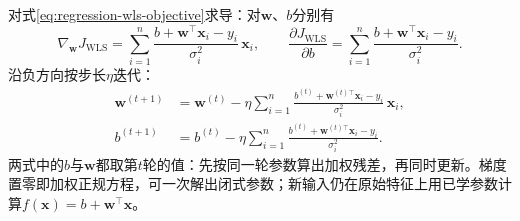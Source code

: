 对式\eqref{eq:regression-wls-objective}求导：对$\bm{w}$、$b$分别有
\[
  \nabla_{\bm w}J_{\mathrm{WLS}}
  =\sum_{i=1}^{n}\frac{b+\bm{w}^{\top}\bm{x}_i-y_i}{\sigma_i^2}\,\bm{x}_i,
  \qquad
  \frac{\partial J_{\mathrm{WLS}}}{\partial b}
  =\sum_{i=1}^{n}\frac{b+\bm{w}^{\top}\bm{x}_i-y_i}{\sigma_i^2}.
\]
沿负方向按步长$\eta$迭代：
\begin{align}
  \bm{w}^{(t+1)}
  &=\bm{w}^{(t)}-\eta\sum_{i=1}^{n}\frac{b^{(t)}+\bm{w}^{(t)\top}\bm{x}_i-y_i}{\sigma_i^2}\,\bm{x}_i,\\
  b^{(t+1)}
  &=b^{(t)}-\eta\sum_{i=1}^{n}\frac{b^{(t)}+\bm{w}^{(t)\top}\bm{x}_i-y_i}{\sigma_i^2}.
  \label{eq:regression-wls-gradient}
\end{align}
两式中的$b$与$\bm{w}$都取第$t$轮的值：先按同一轮参数算出加权残差，再同时更新。梯度置零即加权正规方程，可一次解出闭式参数；新输入仍在原始特征上用已学参数计算$f(\bm{x})=b+\bm{w}^{\top}\bm{x}$。
